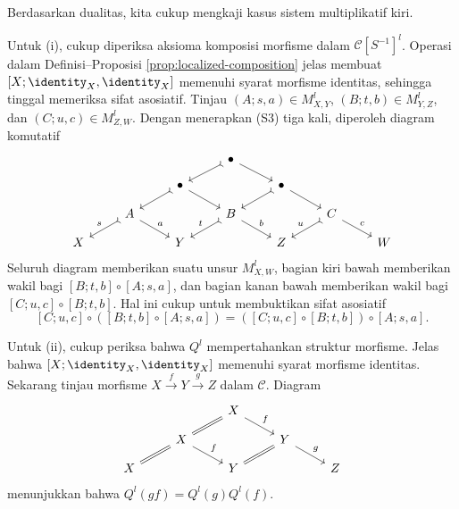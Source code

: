 \begin{bukti}
	Berdasarkan dualitas, kita cukup mengkaji kasus sistem multiplikatif kiri.

	Untuk (i), cukup diperiksa aksioma komposisi morfisme dalam
	$\mathcal{C}[S^{-1}]^l$. Operasi dalam Definisi--Proposisi
	\ref{prop:localized-composition} jelas membuat
	$[X;\identity_X,\identity_X]$ memenuhi syarat morfisme identitas, sehingga
	tinggal memeriksa sifat asosiatif. Tinjau
	$(A;s,a)\in M_{X,Y}^l$, $(B;t,b)\in M_{Y,Z}^l$, dan
	$(C;u,c)\in M_{Z,W}^l$. Dengan menerapkan (S3) tiga kali, diperoleh diagram
	komutatif
	\[\begin{tikzcd}[row sep=small]
		& & & \bullet \arrow[rightarrowtail, ld] \arrow[rd] & & & \\
		& & \bullet \arrow[rightarrowtail, ld] \arrow[rd] & & \bullet \arrow[rightarrowtail, ld] \arrow[rd] & & \\
		& A \arrow[rightarrowtail, ld, "s"'] \arrow[rd, "a"] & & B \arrow[rightarrowtail, ld, "t"'] \arrow[rd, "b"] & & C \arrow[rightarrowtail, ld, "u"'] \arrow[rd, "c"] & \\
		X & & Y & & Z & & W
	\end{tikzcd}\]
	Seluruh diagram memberikan suatu unsur $M_{X,W}^l$, bagian kiri bawah
	memberikan wakil bagi $[B;t,b]\circ[A;s,a]$, dan bagian kanan bawah
	memberikan wakil bagi $[C;u,c]\circ[B;t,b]$. Hal ini cukup untuk
	membuktikan sifat asosiatif
	\[ [C; u, c] \circ ([B; t, b] \circ [A; s, a]) = ([C; u, c] \circ [B; t, b]) \circ [A; s, a]. \]

	Untuk (ii), cukup periksa bahwa $Q^l$ mempertahankan struktur morfisme.
	Jelas bahwa $[X;\identity_X,\identity_X]$ memenuhi syarat morfisme
	identitas. Sekarang tinjau morfisme
	$X \xrightarrow{f} Y \xrightarrow{g} Z$ dalam $\mathcal{C}$. Diagram
	\[\begin{tikzcd}[row sep=small]
		& & X \arrow[equal, ld] \arrow[rd, "f"] & & \\
		& X \arrow[equal, ld] \arrow[rd, "f"] & & Y \arrow[equal, ld] \arrow[rd, "g"] & \\
		X & & Y & & Z
	\end{tikzcd}\]
	menunjukkan bahwa $Q^l(gf)=Q^l(g)Q^l(f)$.
\end{bukti}

